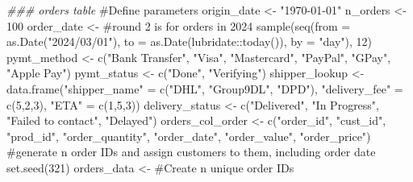 \documentclass[
  letterpaper,
  DIV=11,
  numbers=noendperiod]{scrartcl}
\newenvironment{Shaded}{\begin{snugshade}}{\end{snugshade}}
\newcommand{\AttributeTok}[1]{\textcolor[rgb]{0.40,0.45,0.13}{#1}}
\newcommand{\CommentTok}[1]{\textcolor[rgb]{0.37,0.37,0.37}{#1}}
\newcommand{\DecValTok}[1]{\textcolor[rgb]{0.68,0.00,0.00}{#1}}
\newcommand{\DocumentationTok}[1]{\textcolor[rgb]{0.37,0.37,0.37}{\textit{#1}}}
\newcommand{\FunctionTok}[1]{\textcolor[rgb]{0.28,0.35,0.67}{#1}}
\newcommand{\NormalTok}[1]{\textcolor[rgb]{0.00,0.23,0.31}{#1}}
\newcommand{\OtherTok}[1]{\textcolor[rgb]{0.00,0.23,0.31}{#1}}
\newcommand{\SpecialCharTok}[1]{\textcolor[rgb]{0.37,0.37,0.37}{#1}}
\newcommand{\StringTok}[1]{\textcolor[rgb]{0.13,0.47,0.30}{#1}}
\begin{document}
\begin{Shaded}
\begin{Highlighting}[numbers=left,,]
\DocumentationTok{\#\#\# \textquotesingle{}orders\textquotesingle{} table}
\CommentTok{\#Define parameters}
\NormalTok{origin\_date }\OtherTok{\textless{}{-}} \StringTok{"1970{-}01{-}01"}
\NormalTok{n\_orders }\OtherTok{\textless{}{-}} \DecValTok{100}
\NormalTok{order\_date }\OtherTok{\textless{}{-}} \CommentTok{\#round 2 is for orders in 2024}
  \FunctionTok{sample}\NormalTok{(}\FunctionTok{seq}\NormalTok{(}\AttributeTok{from =} \FunctionTok{as.Date}\NormalTok{(}\StringTok{"2024/03/01"}\NormalTok{), }
             \AttributeTok{to =} \FunctionTok{as.Date}\NormalTok{(lubridate}\SpecialCharTok{::}\FunctionTok{today}\NormalTok{()), }\AttributeTok{by =} \StringTok{"day"}\NormalTok{), }\DecValTok{12}\NormalTok{)}
\NormalTok{pymt\_method }\OtherTok{\textless{}{-}} 
  \FunctionTok{c}\NormalTok{(}\StringTok{"Bank Transfer"}\NormalTok{, }\StringTok{"Visa"}\NormalTok{, }\StringTok{"Mastercard"}\NormalTok{, }\StringTok{"PayPal"}\NormalTok{, }\StringTok{"GPay"}\NormalTok{, }\StringTok{"Apple Pay"}\NormalTok{)}
\NormalTok{pymt\_status }\OtherTok{\textless{}{-}} \FunctionTok{c}\NormalTok{(}\StringTok{"Done"}\NormalTok{, }\StringTok{"Verifying"}\NormalTok{)}
\NormalTok{shipper\_lookup }\OtherTok{\textless{}{-}} 
  \FunctionTok{data.frame}\NormalTok{(}\StringTok{"shipper\_name"} \OtherTok{=} \FunctionTok{c}\NormalTok{(}\StringTok{"DHL"}\NormalTok{, }\StringTok{"Group9DL"}\NormalTok{, }\StringTok{"DPD"}\NormalTok{),}
             \StringTok{"delivery\_fee"} \OtherTok{=} \FunctionTok{c}\NormalTok{(}\DecValTok{5}\NormalTok{,}\DecValTok{2}\NormalTok{,}\DecValTok{3}\NormalTok{),}
             \StringTok{"ETA"} \OtherTok{=} \FunctionTok{c}\NormalTok{(}\DecValTok{1}\NormalTok{,}\DecValTok{5}\NormalTok{,}\DecValTok{3}\NormalTok{))}
\NormalTok{delivery\_status }\OtherTok{\textless{}{-}} \FunctionTok{c}\NormalTok{(}\StringTok{"Delivered"}\NormalTok{, }\StringTok{"In Progress"}\NormalTok{, }
                     \StringTok{"Failed to contact"}\NormalTok{, }\StringTok{"Delayed"}\NormalTok{)}
\NormalTok{orders\_col\_order }\OtherTok{\textless{}{-}} 
  \FunctionTok{c}\NormalTok{(}\StringTok{"order\_id"}\NormalTok{, }\StringTok{"cust\_id"}\NormalTok{, }\StringTok{"prod\_id"}\NormalTok{, }\StringTok{"order\_quantity"}\NormalTok{,}
    \StringTok{"order\_date"}\NormalTok{, }\StringTok{"order\_value"}\NormalTok{, }\StringTok{"order\_price"}\NormalTok{)}
\CommentTok{\#generate n order IDs and assign customers to them, including order date}
\FunctionTok{set.seed}\NormalTok{(}\DecValTok{321}\NormalTok{)}
\NormalTok{orders\_data }\OtherTok{\textless{}{-}} 
  \CommentTok{\#Create n unique order IDs}

\end{Highlighting}
\end{Shaded}
\end{document}

